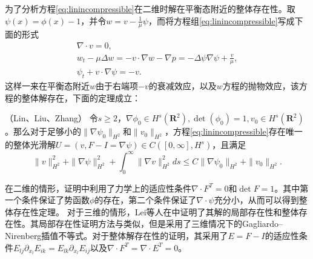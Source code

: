 为了分析方程\eqref{eq:linincompressible}在二维时解在平衡态附近的整体存在性。取$\psi(x) = \phi(x)-1$，并令$w=v-\frac{1}{\mu}\psi$，而将方程组\eqref{eq:linincompressible}写成下面的形式
\begin{eqnarray*}
	\nabla \cdot v =0 , \\
	w_t - \mu \Delta w = - v \cdot \nabla w - \nabla p = - \Delta \psi \nabla \psi + \frac{v}{\mu}, \\
	\psi_t + v \cdot \nabla \psi = -v.
\end{eqnarray*}
这样一来在平衡态附近$w$由于右端项$-v$的衰减效应，以及$w$方程的抛物效应，该方程的整体解存在，下面的定理成立：
\begin{theorem}（Lin、Liu、Zhang\cite{lin2005hydrodynamics}）
	令$s \ge 2$，$\nabla \phi_0 \in H^s(\mathbf{R}^2),\det(\phi_0) = 1, v_0 \in H^s(\mathbf{R}^2)$。那么对于足够小的$\|\nabla \psi_0\|_{H^2}$和$\|v_0\|_{H^2}$，方程\eqref{eq:linincompressible}存在唯一的整体光滑解$U=(v,F-I=\nabla \psi) \in C([0,\infty],H^s)$，且满足
	\begin{equation*}
		\|v\|_{H^2}^2 +\|\nabla \psi\|_{H^2}^2 + \int_0^\infty \|\nabla v\|_{H^2}
^2ds \le C \|\nabla \psi_0\|_{H^2} + \|v_0\|_{H^2}.
	\end{equation*}
	\end{theorem}
	在二维的情形，证明中利用了力学上的适应性条件$\nabla \cdot F^T = 0$和$\det F =1$。其中第一个条件保证了势函数$\phi$的存在，第二个条件保证了$\nabla \cdot \psi$充分小，从而可以得到整体存在性定理。
对于三维的情形，Lei等人在\cite{lei2008global}中证明了其解的局部存在性和整体存在性。其局部存在性证明方法与\cite{lin2005hydrodynamics}类似，但是采用了三维情况下的Gagliardo–Nirenberg插值不等式。对于整体解存在性的证明，其采用了$E=F-I$的适应性条件$E_{lj}\partial_{x_l} E_{ik}=E_{lk}\partial_{x_l} E_{ij}$以及$\nabla \cdot F^T=\nabla \cdot E^T=0$。

